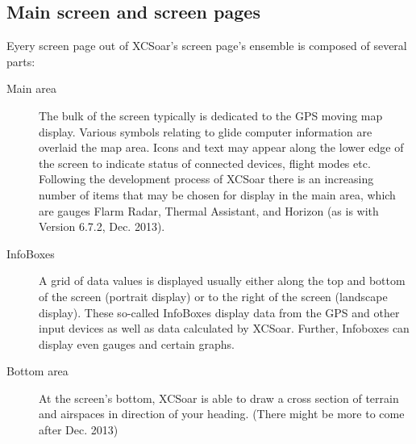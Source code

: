 \subsection*{Main screen and screen pages}
Eyery screen page out of XCSoar's screen page's ensemble is composed of several 
parts:
\begin{description}
\item[Main area] The bulk of the screen typically is dedicated to the GPS moving 
map display. Various symbols relating to glide computer information are overlaid 
the map area. Icons and text may appear along the lower edge of the screen
to indicate status of connected devices, flight modes etc.
Following the development process of XCSoar there is an increasing number of 
items that may be chosen for display in the main area, which are gauges 
Flarm Radar, Thermal Assistant, and Horizon (as is with Version 6.7.2, 
Dec. 2013).
\item[InfoBoxes] A grid of data values is displayed usually either along
the top and bottom of the screen (portrait display) or to the right of the
screen (landscape display).  These so-called InfoBoxes display data from the
GPS and other input devices as well as data calculated by XCSoar. Further, 
Infoboxes can display even gauges and certain graphs.
\item[Bottom area] At the screen's bottom, XCSoar is able to draw a cross 
section of terrain and airspaces in direction of your heading. (There might be 
more to come after Dec. 2013)
\end{description}

